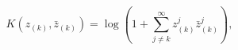 \begin{equation}
K(z_{(k)}, {\bar z}_{(k)})=
\log{\left(1 + \sum_{j\neq k}^{\infty} z^j_{(k)} {\bar z}^j_{(k)}\right)},
\label{fubst}
\end{equation} 
